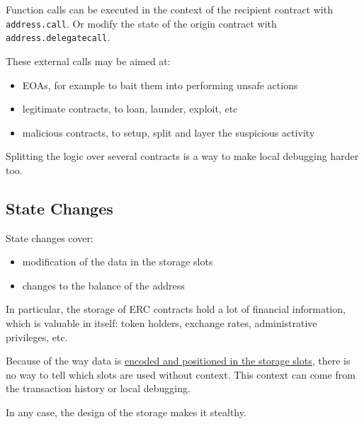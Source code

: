 Function calls can be executed in the context of the recipient contract with \lstinline[language=Solidity]{address.call}.
Or modify the state of the origin contract with \lstinline[language=Solidity]{address.delegatecall}.

These external calls may be aimed at:

\begin{itemize}
\item{EOAs, for example to bait them into performing unsafe actions}
\item{legitimate contracts, to loan, launder, exploit, etc}
\item{malicious contracts, to setup, split and layer the suspicious activity}
\end{itemize}

Splitting the logic over several contracts is a way to make local debugging harder too.

\subsection{State Changes}

State changes cover:

\begin{itemize}
\item{modification of the data in the storage slots}
\item{changes to the balance of the address}
\end{itemize}

In particular, the storage of ERC contracts hold a lot of financial information, which is valuable in itself:
token holders, exchange rates, administrative privileges, etc.

Because of the way data is \href{\urldocsstoragelayout}{encoded and positioned in the storage slots}, there is no way to tell which slots are used without context.
This context can come from the transaction history or local debugging.

In any case, the design of the storage makes it stealthy.
